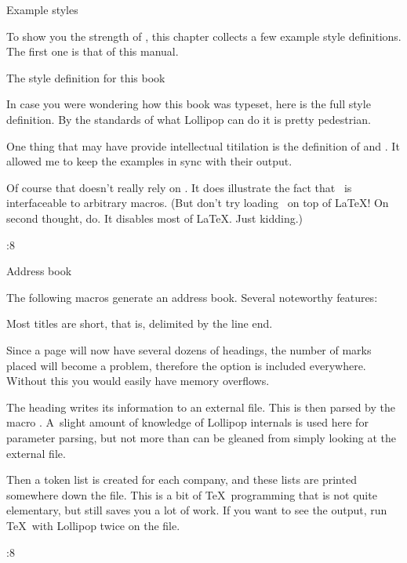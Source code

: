 %
\Chapter Example styles

To show you the strength of \Lollipop, this chapter collects a few
example style definitions. The first one is that of this manual.

\Section The style definition for this book

In case you were wondering how this book was typeset, here is the
full style definition. By the standards of what Lollipop can do it is
pretty pedestrian.

One thing that may have provide intellectual titilation is the
definition of  and .
It allowed me to keep the examples in sync with their output.

Of course that
doesn't really rely on \Lollipop. It does illustrate the fact that
\Lollipop\ is interfaceable to arbitrary macros. (But don't try
loading \Lollipop\ on top of \LaTeX! On second thought, do. It
disables most of \LaTeX. Just kidding.)

\begingroup \PointSize:8 \tt 
{}\endgroup

 Address book

The following macros generate an address book. Several noteworthy
features:
\Itemize\item Most titles are short, that is, delimited by the line
end.
 \item Since a page will now have several dozens of headings, the
number of marks placed will become a problem, therefore the option
 is included everywhere. Without this you would easily
have memory overflows.
 \item The  heading writes its information to an external
file. This is then parsed by the macro . A~slight amount
of knowledge of Lollipop internals is used here for parameter parsing,
but not more than can be gleaned from simply looking at the external
file.\par
 Then a token list is created for each company, and these lists are
printed somewhere down the file. This is a bit of \TeX\ programming
that is not quite elementary, but still \Lollipop saves you a lot of
work.
 \>
If you want to see the output, run \TeX\ with Lollipop twice on the
 file.

 \begingroup \PointSize:8 \tt 
{}\endgroup

\endinput